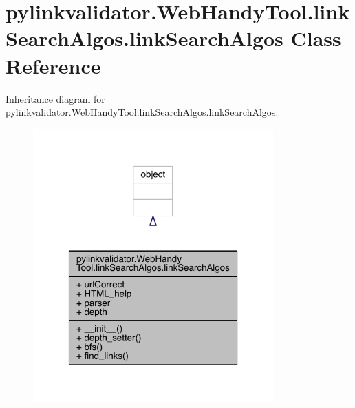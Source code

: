 \hypertarget{classpylinkvalidator_1_1_web_handy_tool_1_1link_search_algos_1_1link_search_algos}{}\section{pylinkvalidator.\+Web\+Handy\+Tool.\+link\+Search\+Algos.\+link\+Search\+Algos Class Reference}
\label{classpylinkvalidator_1_1_web_handy_tool_1_1link_search_algos_1_1link_search_algos}


Inheritance diagram for pylinkvalidator.\+Web\+Handy\+Tool.\+link\+Search\+Algos.\+link\+Search\+Algos\+:
\nopagebreak
\begin{figure}[H]
\begin{center}
\leavevmode
\includegraphics[width=262pt]{classpylinkvalidator_1_1_web_handy_tool_1_1link_search_algos_1_1link_search_algos__inherit__graph}
\end{center}
\end{figure}


